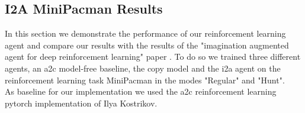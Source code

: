 \subsection{I2A MiniPacman Results}

In this section we demonstrate the performance of our reinforcement learning agent and compare our results with the results of the "imagination augmented agent for deep reinforcement learning" paper \cite{I2A}.
To do so we trained three different agents, an a2c model-free baseline, the copy model and the i2a agent on the reinforcement learning task MiniPacman in the modes "Regular" and "Hunt".\\

As baseline for our implementation we used the a2c reinforcement learning pytorch implementation of Ilya Kostrikov\cite{pytorchrl}.

